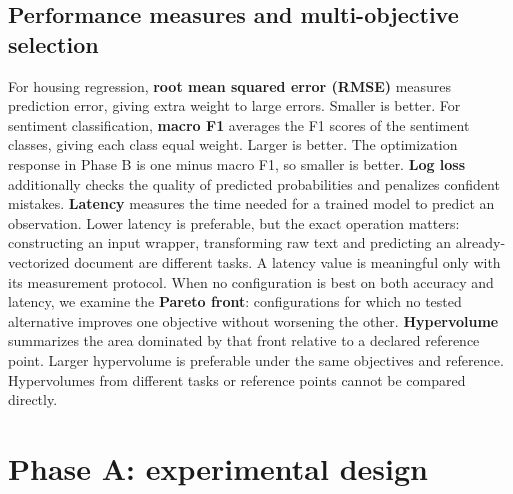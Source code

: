 \documentclass[12pt,a4paper]{article}
\newcommand{\term}[1]{\textbf{#1}}
\begin{document}
\subsection{Performance measures and multi-objective selection}
For housing regression, \term{root mean squared error (RMSE)} measures prediction error, giving extra weight to large errors. Smaller is better. For sentiment classification, \term{macro F1} averages the F1 scores of the sentiment classes, giving each class equal weight. Larger is better. The optimization response in Phase B is one minus macro F1, so smaller is better. \term{Log loss} additionally checks the quality of predicted probabilities and penalizes confident mistakes.
\term{Latency} measures the time needed for a trained model to predict an observation. Lower latency is preferable, but the exact operation matters: constructing an input wrapper, transforming raw text and predicting an already-vectorized document are different tasks. A latency value is meaningful only with its measurement protocol.
When no configuration is best on both accuracy and latency, we examine the \term{Pareto front}: configurations for which no tested alternative improves one objective without worsening the other. \term{Hypervolume} summarizes the area dominated by that front relative to a declared reference point. Larger hypervolume is preferable under the same objectives and reference. Hypervolumes from different tasks or reference points cannot be compared directly.
\section{Phase A: experimental design}
\end{document}
